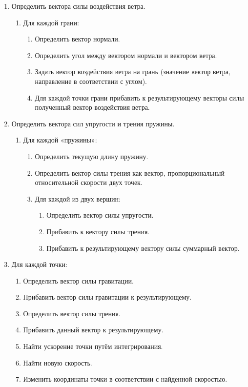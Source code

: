 \begin{enumerate} 
	\item Определить вектора силы воздействия ветра.
	\begin{enumerate} 
		\item Для каждой грани:
		\begin{enumerate} 
			\item Определить вектор нормали.
			\item Определить угол между вектором нормали и вектором ветра.
			\item Задать вектор воздействия ветра на грань (значение вектор ветра, направление в соответствии с углом).
			\item Для каждой точки грани прибавить к результирующему векторы силы полученный вектор воздействия ветра.
		\end{enumerate}
	\end{enumerate}
	\item Определить вектора сил упругости и трения пружины.
	\begin{enumerate} 
		\item Для каждой «пружины»:
		\begin{enumerate} 
			\item Определить текущую длину пружину.
			\item Определить вектор силы трения как вектор, пропорциональный относительной скорости двух точек.
			\item Для каждой из двух вершин:
			\begin{enumerate}
				\item Определить вектор силы упругости.
				\item Прибавить к вектору силы трения.
				\item Прибавить к результирующему вектору силы суммарный вектор.
			\end{enumerate}
		\end{enumerate}
	\end{enumerate}
	\item Для каждой точки:
	\begin{enumerate}
		\item Определить вектор силы гравитации.
		\item Прибавить вектор силы гравитации к результирующему.
		\item Определить вектор силы трения.
		\item Прибавить данный вектор к результирующему.
		\item Найти ускорение точки путём интегрирования.
		\item Найти новую скорость.
		\item Изменить координаты точки в соответствии с найденной скоростью.
	\end{enumerate}
\end{enumerate}

